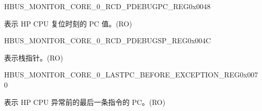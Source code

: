 \begin{register}{H}{BUS\_MONITOR\_CORE\_0\_RCD\_PDEBUGPC\_REG}{0x0048}\label{regdesc:BUSMONITORCORE0RCDPDEBUGPCREG}
%
\regnewline%
\begin{regdesc}\begin{reglist}
\label{fielddesc:BUSMONITORCORE0RCDPDEBUGPC}\item [BUS\_MONITOR\_CORE\_0\_RCD\_PDEBUGPC] 表示 HP CPU 复位时刻的 PC 值。(RO)
\end{reglist}\end{regdesc}
\end{register}


\begin{register}{H}{BUS\_MONITOR\_CORE\_0\_RCD\_PDEBUGSP\_REG}{0x004C}\label{regdesc:BUSMONITORCORE0RCDPDEBUGSPREG}
%
\regnewline%
\begin{regdesc}\begin{reglist}
\label{fielddesc:BUSMONITORCORE0RCDPDEBUGSP}\item [BUS\_MONITOR\_CORE\_0\_RCD\_PDEBUGSP] 表示栈指针。(RO)
\end{reglist}\end{regdesc}
\end{register}


\begin{register}{H}{BUS\_MONITOR\_CORE\_0\_LASTPC\_BEFORE\_EXCEPTION\_REG}{0x0070}\label{regdesc:BUSMONITORCORE0LASTPCBEFOREEXCEPTIONREG}
%
\regnewline%
\begin{regdesc}\begin{reglist}
\label{fielddesc:BUSMONITORCORE0LASTPCBEFOREEXC}\item [BUS\_MONITOR\_CORE\_0\_LASTPC\_BEFORE\_EXC] 表示 HP CPU 异常前的最后一条指令的 PC。(RO)
\end{reglist}\end{regdesc}
\end{register}


